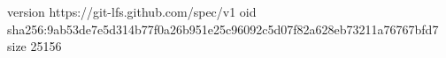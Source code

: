version https://git-lfs.github.com/spec/v1
oid sha256:9ab53de7e5d314b77f0a26b951e25c96092c5d07f82a628eb73211a76767bfd7
size 25156
